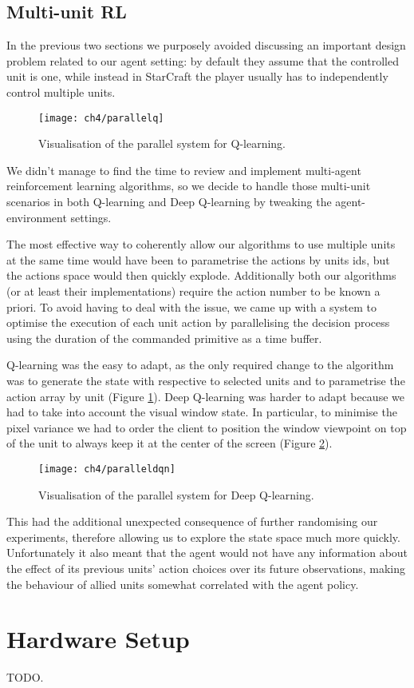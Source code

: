 \subsection{Multi-unit RL}

In the previous two sections we purposely avoided discussing an important design
problem related to our agent setting: by default they assume that the controlled
unit is one, while instead in StarCraft the player usually has to independently
control multiple units.

\begin{figure}[h]
    \centering
    \texttt{[image: ch4/parallelq]}
    \caption{Visualisation of the parallel system for Q-learning.}
    \label{fig:parallelq}
\end{figure}

We didn't manage to find the time to review and implement multi-agent
reinforcement learning algorithms, so we decide to handle those multi-unit
scenarios in both Q-learning and Deep Q-learning by tweaking the
agent-environment settings.

The most effective way to coherently allow our algorithms to use multiple units
at the same time would have been to parametrise the actions by units ids, but
the actions space would then quickly explode. Additionally both our algorithms
(or at least their implementations) require the action number to be known a
priori. To avoid having to deal with the issue, we came up with a system to
optimise the execution of each unit action by parallelising the decision process
using the duration of the commanded primitive as a time buffer.

Q-learning was the easy to adapt, as the only required change to the algorithm
was to generate the state with respective to selected units and to parametrise
the action array by unit (Figure \ref{fig:parallelq}). Deep Q-learning was
harder to adapt because we had to take into account the visual window state. In
particular, to minimise the pixel variance we had to order the client to
position the window viewpoint on top of the unit to always keep it at the center
of the screen (Figure \ref{fig:paralleldqn}).

\begin{figure}[h]
    \centering
    \texttt{[image: ch4/paralleldqn]}
    \caption{Visualisation of the parallel system for Deep Q-learning.}
    \label{fig:paralleldqn}
\end{figure}

This had the additional unexpected consequence of further randomising our
experiments, therefore allowing us to explore the state space much more quickly.
Unfortunately it also meant that the agent would not have any information about
the effect of its previous units' action choices over its future observations,
making the behaviour of allied units somewhat correlated with the agent policy.


\section{Hardware Setup}

TODO.